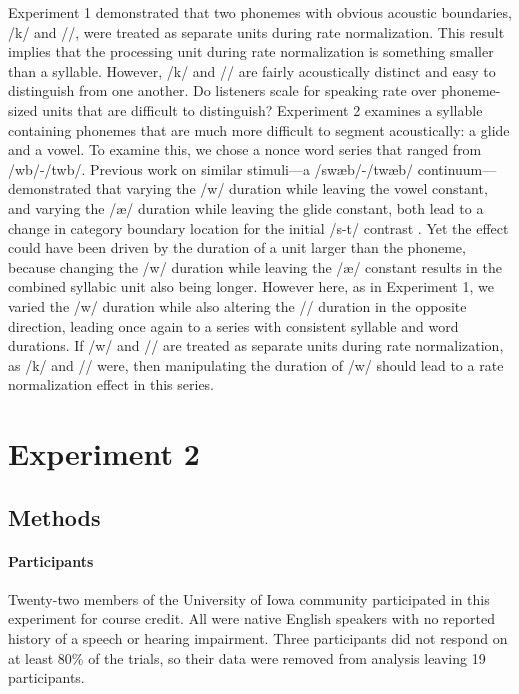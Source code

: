 Experiment 1 demonstrated that two phonemes with obvious acoustic boundaries, /k/ and /\textscripta/, were treated as separate units during rate normalization. This result implies that the processing unit during rate normalization is something smaller than a syllable. However, /k/ and /\textscripta/ are fairly acoustically distinct and easy to distinguish from one another. Do listeners scale for speaking rate over phoneme-sized units that are difficult to distinguish? Experiment 2 examines a syllable containing phonemes that are much more difficult to segment acoustically: a glide and a vowel. To examine this, we chose a nonce word series that ranged from /\textesh w\textsci b/-/t\textesh w\textsci b/. Previous work on similar stimuli---a /sw\ae b/-/tw\ae b/ continuum---demonstrated that varying the /w/ duration while leaving the vowel constant, and varying the /\ae/ duration while leaving the glide constant, both lead to a change in category boundary location for the initial /s-t/ contrast \citep{newmanPerceptualNormalizationSpeaking1996}. Yet the effect could have been driven by the duration of a unit larger than the phoneme, because changing the /w/ duration while leaving the /\ae/ constant results in the combined syllabic unit also being longer. However here, as in Experiment 1, we varied the /w/ duration while also altering the /\textsci/ duration in the opposite direction, leading once again to a series with consistent syllable and word durations. If /w/ and /\textsci/ are treated as separate units during rate normalization, as /k/ and /\textscripta/ were, then manipulating the duration of /w/ should lead to a rate normalization effect in this series. 

\section{Experiment 2}\label{exp2}

\subsection{Methods}

\paragraph{Participants}

Twenty-two members of the University of Iowa community participated in this experiment for course credit. All were native English speakers with no reported history of a speech or hearing impairment. Three participants did not respond on at least 80\% of the trials, so their data were removed from analysis leaving 19 participants. 

